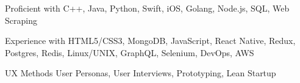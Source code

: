 

\begin{cvskills}
	
	\cvskill
	{Proficient with} %
	{C++, Java, Python, Swift, iOS, Golang, Node.js, SQL, Web Scraping}

	\cvskill
	{Experience with} %
	{HTML5/CSS3, MongoDB, JavaScript, React Native, Redux, Postgres, Redis, Linux/UNIX, GraphQL, Selenium, DevOps, AWS} %
	
	\cvskill
	{UX Methods} %
	{User Personas, User Interviews, Prototyping, Lean Startup} %
	
	
\end{cvskills}
